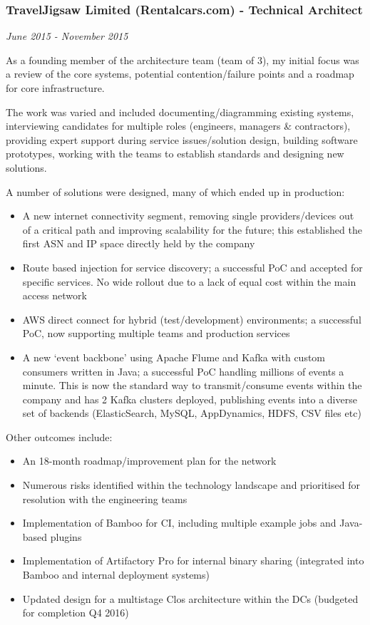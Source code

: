 \subsubsection{TravelJigsaw Limited (Rentalcars.com) - Technical
Architect}\label{traveljigsaw-limited-rentalcars.com---technical-architect}

\emph{June 2015 - November 2015}

As a founding member of the architecture team (team of 3), my initial
focus was a review of the core systems, potential contention/failure
points and a roadmap for core infrastructure.

The work was varied and included documenting/diagramming existing
systems, interviewing candidates for multiple roles (engineers, managers
\& contractors), providing expert support during service issues/solution
design, building software prototypes, working with the teams to
establish standards and designing new solutions.

A number of solutions were designed, many of which ended up in
production:

\begin{itemize}
\tightlist
\item
  A new internet connectivity segment, removing single providers/devices
  out of a critical path and improving scalability for the future; this
  established the first ASN and IP space directly held by the company
\item
  Route based injection for service discovery; a successful PoC and
  accepted for specific services. No wide rollout due to a lack of equal
  cost within the main access network
\item
  AWS direct connect for hybrid (test/development) environments; a
  successful PoC, now supporting multiple teams and production services
\item
  A new `event backbone' using Apache Flume and Kafka with custom
  consumers written in Java; a successful PoC handling millions of
  events a minute. This is now the standard way to transmit/consume
  events within the company and has 2 Kafka clusters deployed,
  publishing events into a diverse set of backends (ElasticSearch,
  MySQL, AppDynamics, HDFS, CSV files etc)
\end{itemize}

Other outcomes include:

\begin{itemize}
\tightlist
\item
  An 18-month roadmap/improvement plan for the network
\item
  Numerous risks identified within the technology landscape and
  prioritised for resolution with the engineering teams
\item
  Implementation of Bamboo for CI, including multiple example jobs and
  Java-based plugins
\item
  Implementation of Artifactory Pro for internal binary sharing
  (integrated into Bamboo and internal deployment systems)
\item
  Updated design for a multistage Clos architecture within the DCs
  (budgeted for completion Q4 2016)
\end{itemize}

